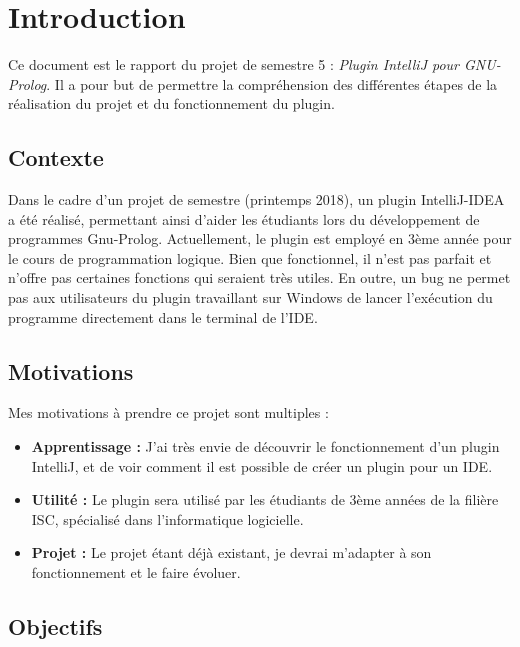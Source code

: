 
\chapter{Introduction}
\noindent
Ce document est le rapport du projet de semestre 5 : \textit{Plugin IntelliJ pour GNU-Prolog}.
Il a pour but de permettre la compréhension des différentes étapes de la réalisation du projet et du fonctionnement du plugin.

\section{Contexte}
\noindent
Dans le cadre d’un projet de semestre (printemps 2018), un plugin IntelliJ-IDEA a été réalisé, permettant ainsi d’aider les étudiants lors du développement de programmes Gnu-Prolog. Actuellement, le plugin est employé en 3ème année pour le cours de programmation logique. Bien que fonctionnel, il n’est pas parfait et n’offre pas certaines fonctions qui seraient très utiles. En outre, un bug ne permet pas aux utilisateurs du plugin travaillant sur Windows de lancer l’exécution du programme directement dans le terminal de l’IDE.

\section{Motivations}
\noindent
Mes motivations à prendre ce projet sont multiples :
\begin{itemize}
    \item \textbf{Apprentissage :} J'ai très envie de découvrir le fonctionnement d'un plugin IntelliJ, et de voir comment il est possible de créer un plugin pour un IDE.
    \item \textbf{Utilité :} Le plugin sera utilisé par les étudiants de 3ème années de la filière ISC, spécialisé dans l'informatique logicielle.
    \item \textbf{Projet :} Le projet étant déjà existant, je devrai m'adapter à son fonctionnement et le faire évoluer.
\end{itemize}

\section{Objectifs}
